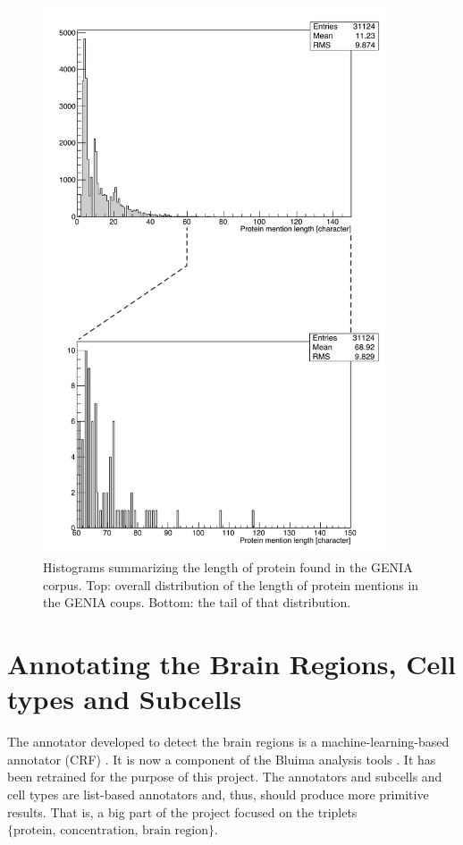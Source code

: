\documentclass{report}
\begin{document}
                  \begin{figure}
                    \includegraphics[width=0.9\textwidth]{fig/genia_dist.pdf}
                    \caption{Histograms summarizing the length of protein found in the GENIA corpus. 
                    Top: overall distribution of the length of protein mentions in the GENIA coups. 
                    Bottom: the tail of that distribution.}
                    \label{fig:hist_genia}
                \end{figure}
                         
                \section{Annotating the Brain Regions, Cell types and Subcells}
                \label{sec:locations}
                The annotator developed to detect the brain regions is a machine-learning-based
                annotator (CRF) \cite{br}. It is now a component of the Bluima analysis tools \cite{bluima}. It
                has been retrained for the purpose of this project. The
                annotators and subcells and cell types are list-based annotators 
                and, thus, should
                produce more primitive results. That is, a big part of the project focused on
                the triplets~$\{\text{protein, concentration, brain region}\}.$
                
\end{document}

